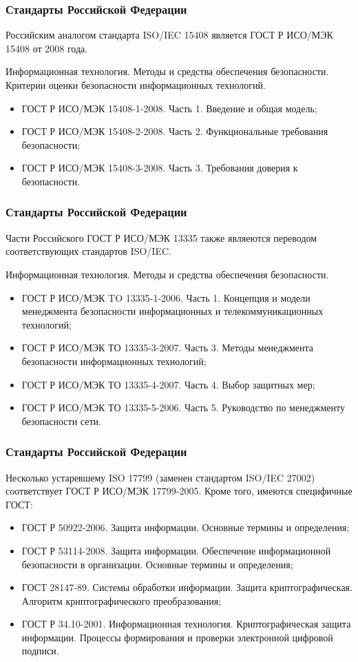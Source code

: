 \begin{frame}
\frametitle{Стандарты Российской Федерации}
Российским аналогом стандарта ISO/IEC 15408 является ГОСТ Р ИСО/МЭК 15408 от 2008 года.

\alert{Информационная технология. Методы и средства обеспечения безопасности. Критерии оценки безопасности информационных технологий.}
\begin{itemize}
    \item ГОСТ Р ИСО/МЭК 15408-1-2008. Часть 1. Введение и общая модель;
    \item ГОСТ Р ИСО/МЭК 15408-2-2008. Часть 2. Функциональные требования безопасности;
    \item ГОСТ Р ИСО/МЭК 15408-3-2008. Часть 3. Требования доверия к безопасности.
\end{itemize}
\end{frame}


\begin{frame}
\frametitle{Стандарты Российской Федерации}
Части Российского ГОСТ Р ИСО/МЭК 13335 также являеются переводом соответствующих стандартов ISO/IEC.

\alert{Информационная технология. Методы и средства обеспечения безопасности.}
\begin{itemize}
    \item ГОСТ Р ИСО/МЭК TO 13335-1-2006. Часть 1. Концепция и модели менеджмента безопасности информационных и телекоммуникационных технологий;
    \item ГОСТ Р ИСО/МЭК ТО 13335-3-2007. Часть 3. Методы менеджмента безопасности информационных технологий;
    \item ГОСТ Р ИСО/МЭК ТО 13335-4-2007. Часть 4. Выбор защитных мер;
    \item ГОСТ Р ИСО/МЭК ТО 13335-5-2006. Часть 5. Руководство по менеджменту безопасности сети.
\end{itemize}
\end{frame}


\begin{frame}
\frametitle{Стандарты Российской Федерации}
Несколько устаревшему ISO 17799 (заменен стандартом ISO/IEC 27002) соответствует \alert{ГОСТ Р ИСО/МЭК 17799-2005}. Кроме того, имеются специфичные ГОСТ:
\begin{itemize}
    \item ГОСТ Р 50922-2006. Защита информации. Основные термины и определения;
    \item ГОСТ Р 53114-2008. Защита информации. Обеспечение информационной безопасности в организации. Основные термины и определения;
    \item ГОСТ 28147-89. Системы обработки информации. Защита криптографическая. Алгоритм криптографического преобразования;
    \item ГОСТ Р 34.10-2001. Информационная технология. Криптографическая защита информации. Процессы формирования и проверки электронной цифровой подписи.
\end{itemize}
\end{frame}


